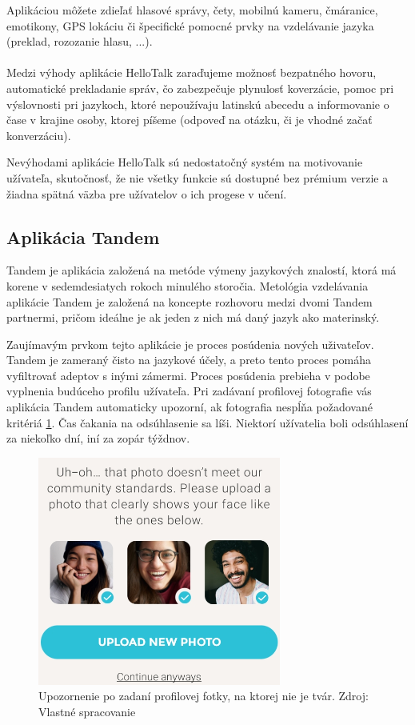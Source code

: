 \documentclass[10pt,oneside,slovak,a4paper]{article}
\begin{document}
Aplikáciou môžete zdieľať hlasové správy, čety, mobilnú kameru, čmáranice, emotikony, GPS lokáciu či špecifické pomocné prvky na vzdelávanie jazyka (preklad, rozozanie hlasu, ...).\cite{hellotalk}\\\\

 Medzi výhody aplikácie HelloTalk zaraďujeme 
 možnosť bezpatného hovoru,
 automatické prekladanie správ, čo zabezpečuje plynulosť koverzácie,
 pomoc pri výslovnosti pri jazykoch, ktoré nepoužívaju latinskú abecedu a
 informovanie o čase v krajine osoby, ktorej píšeme (odpoveď na otázku, či je vhodné začať konverzáciu). \cite{hellotalk}

Nevýhodami aplikácie HelloTalk sú
 nedostatočný systém na motivovanie užívateľa, skutočnosť, že
 nie všetky funkcie sú dostupné bez prémium verzie a
 žiadna spätná väzba pre užívatelov o ich progese v učení. \cite{hellotalk}
\subsection{Aplikácia Tandem} %
Tandem je aplikácia založená na metóde výmeny jazykových znalostí, ktorá má korene v sedemdesiatych rokoch minulého storočia. Metológia vzdelávania aplikácie Tandem je založená na koncepte rozhovoru medzi dvomi Tandem partnermi, pričom ideálne je ak jeden z nich má daný jazyk ako materinský.

Zaujímavým prvkom tejto aplikácie je proces posúdenia nových uživateľov.\cite{tandem} Tandem je zameraný čisto na jazykové účely, a preto tento proces pomáha vyfiltrovať adeptov s inými zámermi. Proces posúdenia prebieha v podobe vyplnenia budúceho profilu užívateľa. Pri zadávaní profilovej fotografie vás aplikácia Tandem automaticky upozorní, ak fotografia nespĺňa požadované kritériá \ref{tandem-obmedzenia}. Čas čakania na odsúhlasenie sa líši. Niektorí užívatelia boli odsúhlasení za niekoľko dní, iní za zopár týždnov.

\begin{figure}[h] %
\centering
\includegraphics{tandem2.png}
\caption{Upozornenie po zadaní profilovej fotky, na ktorej nie je tvár. Zdroj: Vlastné spracovanie}
\label{tandem-obmedzenia}
\end{figure}
\end{document}
